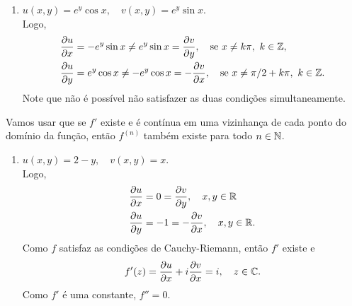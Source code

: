 \begin{questions}
\begin{solution}
\begin{enumerate}[label=(\alph*)]
      \item $u(x,y) = e^y\cos x, \quad v(x,y) = e^y\sin x$.\\ Logo, \vspace{-5mm}
      \begin{align*}
          \frac{\partial u}{\partial x} &= -e^y\sin x \neq e^y\sin x  = \frac{\partial v}{\partial y}, \quad\text{se } x \neq k\pi,~ k\in{\mathbb Z},\\
          \frac{\partial u}{\partial y} &= e^y\cos x \neq -e^y\cos x  = -\frac{\partial v}{\partial x},  \quad\text{se }x \neq \pi/2+k\pi,~ k\in{\mathbb Z}.
      \end{align*}
      Note que não é possível não satisfazer as duas condições simultaneamente.
      
    \end{enumerate}
\end{solution}



\begin{solution}
Vamos usar que se $f'$ existe e é contínua em uma vizinhança de cada ponto do domínio da função, então $f^{(n)}$ também existe para todo $n\in{\mathbb N}$.
    \begin{enumerate}[label=(\alph*)]
        \item $u(x,y) = 2-y, \quad v(x,y) = x$.\\ Logo, \vspace{-5mm}
        \begin{align*}
          \frac{\partial u}{\partial x} &= 0 = \frac{\partial v}{\partial y}, \quad x,y\in{\mathbb R}\\
          \frac{\partial u}{\partial y} &= -1  = -\frac{\partial v}{\partial x}, \quad x,y\in{\mathbb R}.
        \end{align*}
        Como $f$ satisfaz as condições de Cauchy-Riemann, então $f'$ existe e
        \[ f'(z) = \frac{\partial u}{\partial x} + i\frac{\partial v}{\partial x} = i, \quad z\in{\mathbb C}. \]
        Como $f'$ é uma constante, $f'' = 0$.
        

\end{enumerate}
\end{solution}
\end{questions}
